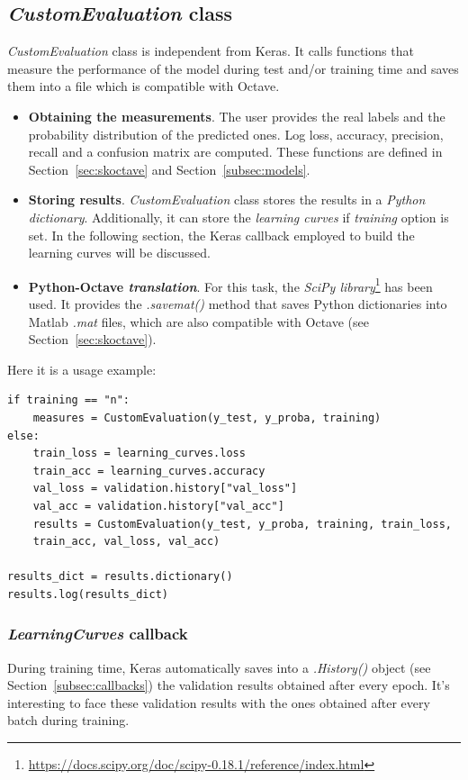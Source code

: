 \subsection{\textit{CustomEvaluation} class}
\emph{\textit{CustomEvaluation}} class is independent from Keras. It calls functions that measure the performance of the model during test and/or training time and saves them into a file which is compatible with Octave.
\begin{itemize}
	\item \textbf{Obtaining the measurements}. The user provides the real labels and the probability distribution of the predicted ones. Log loss, accuracy, precision, recall and a confusion matrix are computed. These functions are defined in Section~\ref{sec:skoctave} and Section~\ref{subsec:models}.
	\item \textbf{Storing results}. \textit{CustomEvaluation} class stores the results in a \emph{Python dictionary}. Additionally, it can store the \emph{learning curves} if \textit{training} option is set. In the following section, the Keras callback employed to build the learning curves will be discussed.
	\item \textbf{Python-Octave \textit{translation}}. For this task, the \emph{SciPy library}\footnote{\url{https://docs.scipy.org/doc/scipy-0.18.1/reference/index.html}} has been used. It provides the \textit{.savemat()} method that saves Python dictionaries into Matlab \textit{.mat} files, which are also compatible with Octave (see Section~\ref{sec:skoctave}).
\end{itemize}

Here it is a usage example:
\begin{lstlisting}
if training == "n":
	measures = CustomEvaluation(y_test, y_proba, training)
else:
	train_loss = learning_curves.loss
	train_acc = learning_curves.accuracy
	val_loss = validation.history["val_loss"]
	val_acc = validation.history["val_acc"]
	results = CustomEvaluation(y_test, y_proba, training, train_loss,
	train_acc, val_loss, val_acc)

results_dict = results.dictionary()
results.log(results_dict)
\end{lstlisting}

\subsubsection{\textit{LearningCurves} callback} \label{subsubsec:learningcurves}
During training time, Keras automatically saves into a \textit{.History()} object (see Section~\ref{subsec:callbacks}) the validation results obtained after every epoch. It's interesting to face these validation results with the ones obtained after every batch during training.

